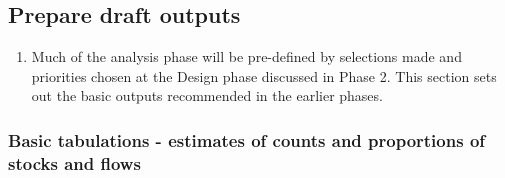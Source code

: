 \documentclass[
]{article}
\providecommand{\tightlist}{%
  \setlength{\itemsep}{0pt}\setlength{\parskip}{0pt}}
\begin{document}
\hypertarget{prepare-draft-outputs-1}{%
\subsection{Prepare draft outputs}\label{prepare-draft-outputs-1}}

\begin{enumerate}
\def\labelenumi{\arabic{enumi}.}
\setcounter{enumi}{400}
\tightlist
\item
  Much of the analysis phase will be pre-defined by selections made
  and priorities chosen at the Design phase discussed in Phase 2. This
  section sets out the basic outputs recommended in the earlier
  phases.
\end{enumerate}

\hypertarget{basic-tabulations---estimates-of-counts-and-proportions-of-stocks-and-flows}{%
\subsubsection{Basic tabulations - estimates of counts and proportions of stocks and flows}\label{basic-tabulations---estimates-of-counts-and-proportions-of-stocks-and-flows}}
\end{document}
